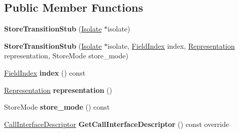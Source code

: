 \subsection*{Public Member Functions}
\begin{DoxyCompactItemize}
\item 
{\bfseries Store\+Transition\+Stub} (\hyperlink{classv8_1_1internal_1_1_isolate}{Isolate} $\ast$isolate)\hypertarget{classv8_1_1internal_1_1_store_transition_stub_ac07f8d2875c2cc6294d98bd34fe0dfd0}{}\label{classv8_1_1internal_1_1_store_transition_stub_ac07f8d2875c2cc6294d98bd34fe0dfd0}

\item 
{\bfseries Store\+Transition\+Stub} (\hyperlink{classv8_1_1internal_1_1_isolate}{Isolate} $\ast$isolate, \hyperlink{classv8_1_1internal_1_1_field_index}{Field\+Index} index, \hyperlink{classv8_1_1internal_1_1_representation}{Representation} representation, Store\+Mode store\+\_\+mode)\hypertarget{classv8_1_1internal_1_1_store_transition_stub_a6296aa64fbf52049fa32178cd187969b}{}\label{classv8_1_1internal_1_1_store_transition_stub_a6296aa64fbf52049fa32178cd187969b}

\item 
\hyperlink{classv8_1_1internal_1_1_field_index}{Field\+Index} {\bfseries index} () const \hypertarget{classv8_1_1internal_1_1_store_transition_stub_a9360ccfe016c540609e4602868842349}{}\label{classv8_1_1internal_1_1_store_transition_stub_a9360ccfe016c540609e4602868842349}

\item 
\hyperlink{classv8_1_1internal_1_1_representation}{Representation} {\bfseries representation} ()\hypertarget{classv8_1_1internal_1_1_store_transition_stub_a7d7fa1b6c953a3db8cdfe8ae8536f6fd}{}\label{classv8_1_1internal_1_1_store_transition_stub_a7d7fa1b6c953a3db8cdfe8ae8536f6fd}

\item 
Store\+Mode {\bfseries store\+\_\+mode} () const \hypertarget{classv8_1_1internal_1_1_store_transition_stub_aa0879ff1837ea3755981fa1d4ef260dd}{}\label{classv8_1_1internal_1_1_store_transition_stub_aa0879ff1837ea3755981fa1d4ef260dd}

\item 
\hyperlink{classv8_1_1internal_1_1_call_interface_descriptor}{Call\+Interface\+Descriptor} {\bfseries Get\+Call\+Interface\+Descriptor} () const  override\hypertarget{classv8_1_1internal_1_1_store_transition_stub_ad0ab6f274f970daec4dbc133642843ad}{}\label{classv8_1_1internal_1_1_store_transition_stub_ad0ab6f274f970daec4dbc133642843ad}

\end{DoxyCompactItemize}
